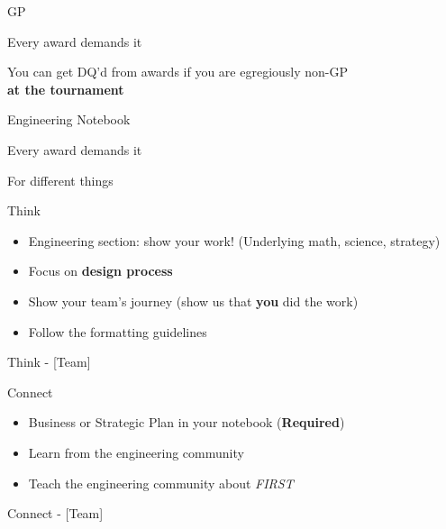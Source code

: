 \documentclass{beamer}
\begin{document}
  \begin{frame}{GP}
    \begin{center}
      \huge{Every award demands it}
      \\
      \pause
      \par
      \small{You can get DQ'd from awards if you are egregiously non-GP
        \\
        \textbf{at the tournament}}
    \end{center}
  \end{frame}

  \begin{frame}{Engineering Notebook}
    \begin{center}
      \huge{Every award demands it}
      \\
      \pause
      \par
      \small{For different things}
    \end{center}
  \end{frame}

  \begin{frame}{Think}
    \begin{itemize}
    \item Engineering section:
      show your work! (Underlying math, science, strategy) \pause
    \item Focus on \textbf{design process} \pause
    \item Show your team's journey
      (show us that \textbf{you} did the work) \pause
    \item Follow the formatting guidelines
    \end{itemize}
  \end{frame}

  \begin{frame}{Think - [Team]}
  \end{frame}

  \begin{frame}{Connect}
    \begin{itemize}
    \item Business or Strategic Plan in your notebook (\textbf{Required})\pause
    \item Learn from the engineering community \pause
    \item Teach the engineering community about \textit{FIRST}
    \end{itemize}
  \end{frame}

  \begin{frame}{Connect - [Team]}
  \end{frame}
\end{document}
